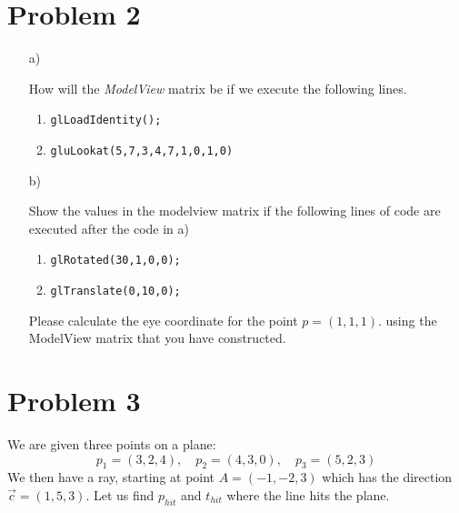 \documentclass[12pt]{article}
\begin{document}
\section*{Problem 2}
\begin{itemize}
\item[a)] {
How will the \emph{ModelView} matrix be if we execute the following lines.
\begin{enumerate}
        \item \texttt{glLoadIdentity();}
        \item \texttt{gluLookat(5,7,3,4,7,1,0,1,0)}
\end{enumerate}
}

\item[b)]{
        Show the values in the modelview matrix if the following lines of code are executed after the code in a)
        \begin{enumerate}
            \item \texttt{glRotated(30,1,0,0);}
            \item \texttt{glTranslate(0,10,0);}
        \end{enumerate}
}
Please calculate the eye coordinate for the point $p=(1,1,1).$ using the ModelView matrix that you have constructed.
\end{itemize}

\section*{Problem 3}
We are given three points on a plane:
\begin{equation*}
    p_1 = (3,2,4), \quad p_2 = (4,3,0), \quad p_3 = (5,2,3)
\end{equation*}
We then have a ray, starting at point $A=(-1,-2,3)$ which has the direction $\vec{c}=(1,5,3)$. Let us find
$p_{hit}$ and $t_{hit}$ where the line hits the plane.
\end{document}
